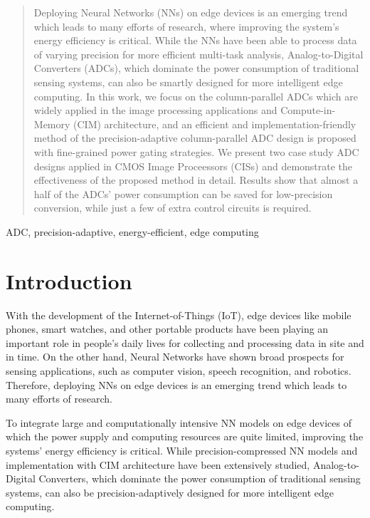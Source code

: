 \documentclass[conference]{IEEEtran}
\begin{document}
\begin{abstract}

Deploying Neural Networks (NNs) on edge devices is an emerging trend which leads to many efforts of research, where improving the system's energy efficiency is critical.
While the NNs have been able to process data of varying precision for more efficient multi-task analysis, Analog-to-Digital Converters (ADCs), 
which dominate the power consumption of traditional sensing systems, can also be smartly designed for more intelligent edge computing. 
In this work, we focus on the column-parallel ADCs which are widely applied in the image processing applications and Compute-in-Memory (CIM) architecture, and 
an efficient and implementation-friendly method of the precision-adaptive column-parallel ADC design is proposed with fine-grained power gating strategies.
We present two case study ADC designs applied in CMOS Image Proceessors (CISs) and demonstrate the effectiveness of the proposed method in detail. 
Results show that almost a half of the ADCs’ power consumption can be saved for low-precision conversion, while just a few of extra control circuits is required.

\end{abstract}

\begin{IEEEkeywords}

ADC, precision-adaptive, energy-efficient, edge computing

\end{IEEEkeywords}

\section{Introduction}

With the development of the Internet-of-Things (IoT), edge devices like mobile phones, smart watches, and other portable products have been playing an important role in people’s daily lives 
for collecting and processing data in site and in time. On the other hand, Neural Networks have shown broad prospects for sensing applications, such as computer vision, speech recognition, 
and robotics. Therefore, deploying NNs on edge devices is an emerging trend which leads to many efforts of research. 

To integrate large and computationally intensive NN models on edge devices of which the power supply and computing resources are quite limited, improving the systems' energy efficiency is critical. 
While precision-compressed NN models \cite{leibe_xnor-net_2016}\cite{li_ternary_2016}\cite{park_energy-efficient_2018} and implementation with CIM architecture \cite{chiu_4-kb_2020}\cite{karunaratne_-memory_2020}\cite{jung_crossbar_2022} have been extensively studied, Analog-to-Digital Converters, which dominate the power consumption of 
traditional sensing systems, can also be precision-adaptively designed for more intelligent edge computing.
\end{document}
